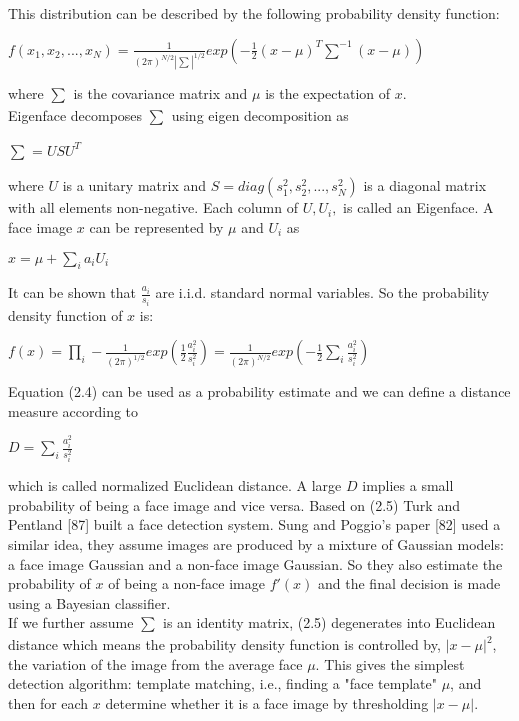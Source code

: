 \documentclass[12pt, twoside]{report}
\begin{document}
	\newpage
	
	\large{This distribution can be described by the following probability density function:}\\
	\begin{center}
		$ f(x_1,x_2,...,x_N) = \frac{1}{(2\pi)^{N/2}|\sum_{}^{}|^{1/2}}exp(-\frac{1}{2}(x-\mu)^T\sum_{}^{-1}(x-\mu))$\\
	\end{center}
	\large{where $\sum_{}^{}$ is the covariance matrix and $\mu$ is the expectation of $x$.\\
	Eigenface decomposes $\sum_{}^{}$ using eigen decomposition as}
	\begin{center}
		$\sum_{}^{} = USU^T$\\
	\end{center}
	\large{where $U$ is a unitary matrix and $S = diag(s^2_1,s^2_2,...,s^2_N)$ is a diagonal matrix with all elements non-negative. Each column of $U, U_i,$ is called an Eigenface. A face image $x$ can be represented by $\mu$ and $U_i$ as}
	\begin{center}
		$x = \mu + \sum_{i}^{}a_iU_i$\\
	\end{center}
	\large{It can be shown that $\frac{a_i}{s_i}$ are i.i.d. standard normal variables. So the probability density function of $x$ is:}
	\begin{center}
		$f(x) = \prod_{i}^{}-\frac{1}{(2\pi)^{1/2}}exp(\frac{1}{2}\frac{a^2_i}{s^2_i}) = \frac{1}{(2\pi)^{N/2}}exp(-\frac{1}{2}\sum_{i}^{}\frac{a^2_i}{s^2_i})$\\
	\end{center}
	\large{Equation (2.4) can be used as a probability estimate and we can define a distance measure according to}
	\begin{center}
		$D = \sum_{i}^{}\frac{a^2_i}{s^2_i}$\\
	\end{center}
	\large{which is called normalized Euclidean distance. A large $D$ implies a small probability of being a face image and vice versa. Based on (2.5) Turk and Pentland [87] built a face detection system. Sung and Poggio's paper [82] used a similar idea, they assume images are produced by a mixture of Gaussian models: a face image Gaussian and a non-face image Gaussian. So they also estimate the probability of $x$ of being a non-face image $f'(x)$ and the final decision is made using a Bayesian classifier.}\\
	\large{If we further assume $\sum_{}^{}$ is an identity matrix, (2.5) degenerates into Euclidean distance which means the probability density function is controlled by, $|x - \mu|^2$, the variation of the image from the average face $\mu$. This gives the simplest detection algorithm: template matching, i.e., finding a "face template" $\mu$, and then for each $x$ determine whether it is a face image by thresholding $|x - \mu|$.}
	
\end{document}
